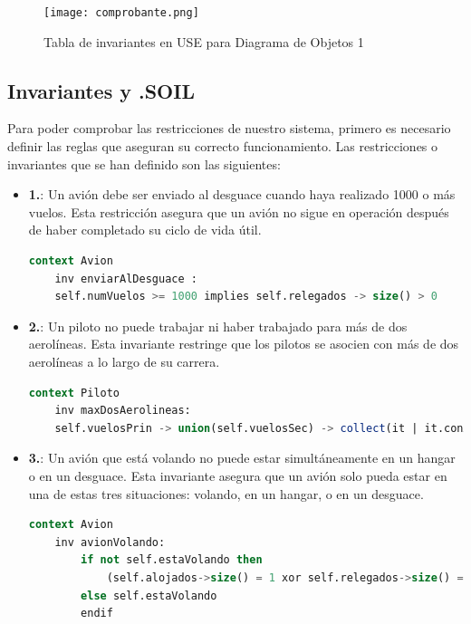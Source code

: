 \documentclass[12pt.a4paper]{article}
\begin{document}
\begin{figure}[H]
     \texttt{[image: comprobante.png]}
     \caption{Tabla de invariantes en USE para Diagrama de Objetos 1}
     \label{Tabla de invariantes en USE para Diagrama de Objetos 1}
\end{figure}
\vspace{1.0cm}

\subsection{Invariantes y .SOIL}
Para poder comprobar las restricciones de nuestro sistema, primero es necesario definir las reglas que aseguran su correcto funcionamiento. Las restricciones o invariantes que se han definido son las siguientes:

\begin{itemize}
    \item \textbf{1.}: Un avión debe ser enviado al desguace cuando haya realizado 1000 o más vuelos. Esta restricción asegura que un avión no sigue en operación después de haber completado su ciclo de vida útil.
    \begin{lstlisting}[style = useEspecifico,language=SQL]
    context Avion
    inv enviarAlDesguace :
    self.numVuelos >= 1000 implies self.relegados -> size() > 0
    \end{lstlisting}
    
    \item \textbf{2.}: Un piloto no puede trabajar ni haber trabajado para más de dos aerolíneas. Esta invariante restringe que los pilotos se asocien con más de dos aerolíneas a lo largo de su carrera.
    \begin{lstlisting}[style = useEspecifico,language=SQL]
   context Piloto
    inv maxDosAerolineas:
    self.vuelosPrin -> union(self.vuelosSec) -> collect(it | it.conAerolinea) -> asSet()-> size() <= 2
    \end{lstlisting}
    
    \item \textbf{3.}: Un avión que está volando no puede estar simultáneamente en un hangar o en un desguace. Esta invariante asegura que un avión solo pueda estar en una de estas tres situaciones: volando, en un hangar, o en un desguace.
    \begin{lstlisting}[style = useEspecifico,language=SQL]
   context Avion
    inv avionVolando:        
        if not self.estaVolando then
            (self.alojados->size() = 1 xor self.relegados->size() = 1)
        else self.estaVolando
        endif
    \end{lstlisting}
    

\end{itemize}
\end{document}
